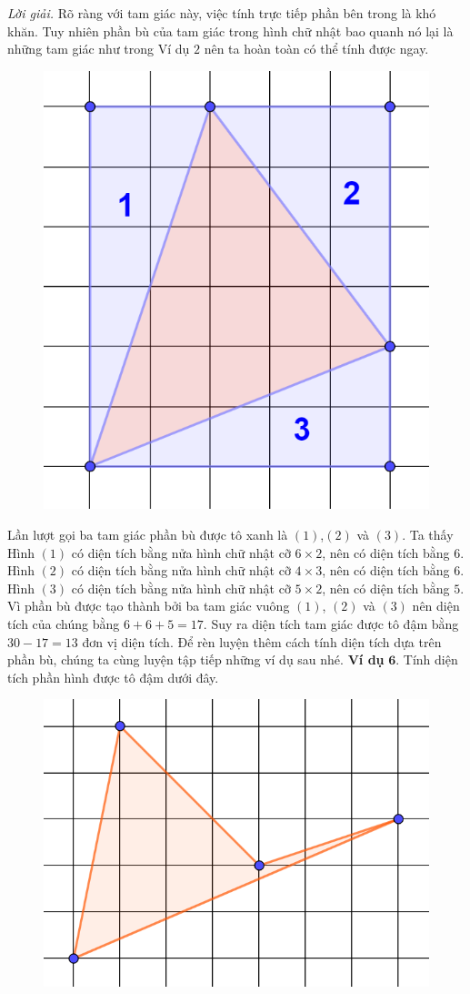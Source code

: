 \begin{multicols}{2}
\begin{figure}[H]
		\vspace*{-10pt}
	\end{figure}
	\textit{Lời giải.} Rõ ràng với tam giác này, việc tính trực tiếp phần bên trong là khó khăn. Tuy nhiên phần bù của tam giác trong hình chữ nhật bao quanh nó lại là những tam giác như trong Ví dụ $2$ nên ta hoàn toàn có thể tính được ngay.
	\begin{figure}[H]
		\centering
		\vspace*{-5pt}
		\captionsetup{labelformat= empty, justification=centering}
		\includegraphics[width=0.5\linewidth]{12}
		\vspace*{-10pt}
	\end{figure}
	Lần lượt gọi ba tam giác phần bù được tô xanh là $(1)$,$(2)$ và $(3)$. Ta thấy
	Hình $(1)$ có diện tích bằng nửa hình chữ nhật cỡ $6\times2$, nên có diện tích bằng $6$.
	\vskip 0.1cm
	Hình $(2)$ có diện tích bằng nửa hình chữ nhật cỡ $4\times3$, nên có diện tích bằng $6$.
	\vskip 0.1cm
	Hình $(3)$ có diện tích bằng nửa hình chữ nhật cỡ $5\times2$, nên có diện tích bằng $5$.
	\vskip 0.1cm
	Vì phần bù được tạo thành bởi ba tam giác vuông $(1)$, $(2)$ và $(3)$ nên diện tích của chúng bằng $6+6+5=17$. Suy ra diện tích tam giác được tô đậm bằng $30-17=13$ đơn vị diện tích.
	\vskip 0.1cm
	Để rèn luyện thêm cách tính diện tích dựa trên phần bù, chúng ta cùng luyện tập tiếp những ví dụ sau nhé. 
	\vskip 0.1cm 
	\textbf{\color{toancuabi}Ví dụ} $\pmb{6.}$ Tính diện tích phần hình được tô đậm dưới đây.
	\begin{figure}[H]
		\centering
		\vspace*{-5pt}
		\captionsetup{labelformat= empty, justification=centering}
		\includegraphics[width=0.6\linewidth]{13}

\end{figure}
\end{multicols}
